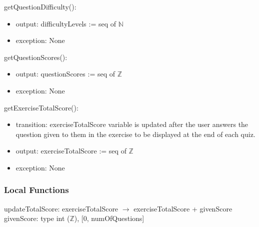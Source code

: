 \documentclass[12pt, titlepage]{article}
\begin{document}
\noindent getQuestionDifficulty():
\begin{itemize}
\item output: difficultyLevels := seq of $\mathbb{N}$
\item exception: None
\end{itemize}

\noindent getQuestionScores():
\begin{itemize}
\item output: questionScores := seq of $\mathbb{Z}$
\item exception: None
\end{itemize}

\noindent getExerciseTotalScore():
\begin{itemize}
\item transition: exerciseTotalScore variable is updated after the user answers the question given to them in the exercise to be displayed at the end of each quiz.
\item output: exerciseTotalScore := seq of $\mathbb{Z}$
\item exception: None
\end{itemize}
%
\subsubsection{Local Functions}

updateTotalScore: exerciseTotalScore $\rightarrow$ exerciseTotalScore + givenScore \\
givenScore: type int ($\mathbb{Z}$), [0, numOfQuestions]


\newpage


%
%
\end{document}
